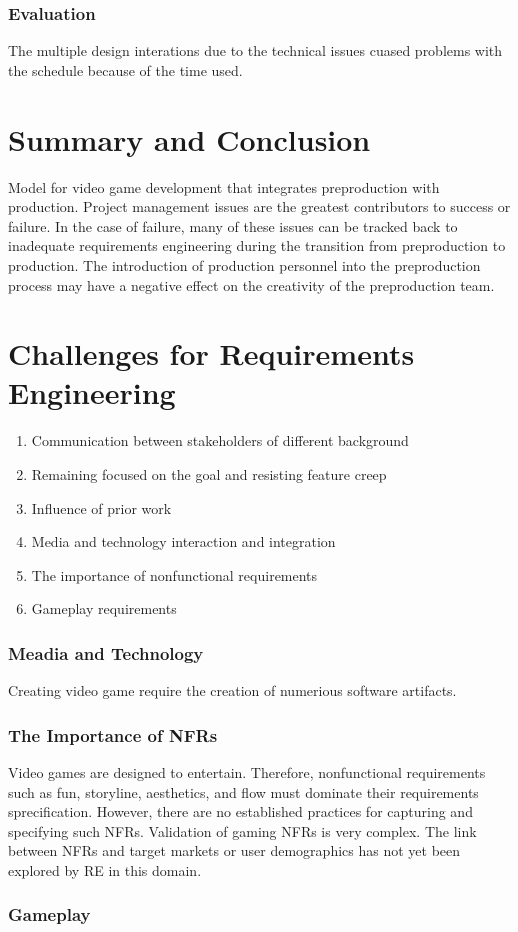     \subsubsection*{Evaluation}
    The multiple design interations due to the technical issues cuased problems with the schedule because of the time used. 

  \section*{Summary and Conclusion}
  Model for video game development that integrates preproduction with production. Project management issues are the greatest contributors to success or failure. In the case of failure, many of these issues can be tracked back to inadequate requirements engineering during the transition from preproduction to production. The introduction of production personnel into the preproduction process may have a negative effect on the creativity of the preproduction team. 


  \section*{Challenges for Requirements Engineering}

  \begin{enumerate}
    \item Communication between stakeholders of different background
    \item Remaining focused on the goal and resisting feature creep
    \item Influence of prior work
    \item Media and technology interaction and integration
    \item The importance of nonfunctional requirements
    \item Gameplay requirements

  \end{enumerate}

    \subsubsection*{Meadia and Technology}
    Creating video game require the creation of numerious software artifacts.

    \subsubsection*{The Importance of NFRs}
    Video games are designed to entertain. Therefore, nonfunctional requirements such as fun, storyline, aesthetics, and flow must dominate their requirements sprecification. However, there are no established practices for capturing and specifying such NFRs. 
    Validation of gaming NFRs is very complex. The link between NFRs and target markets or user demographics has not yet been explored by RE in this domain. 

    \subsubsection*{Gameplay}
